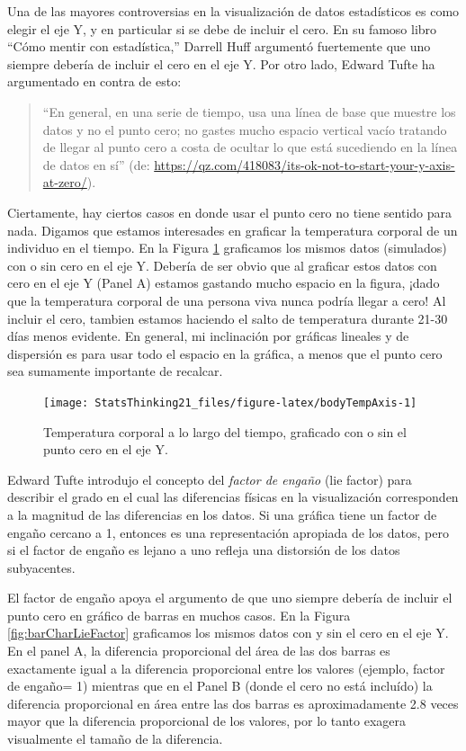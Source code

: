 \documentclass[
  12pt,
]{book}
\theoremstyle{definition}
\theoremstyle{definition}
\theoremstyle{definition}
\theoremstyle{remark}
\begin{document}
Una de las mayores controversias en la visualización de datos estadísticos es como elegir el eje Y, y en particular si se debe de incluir el cero. En su famoso libro ``Cómo mentir con estadística,'' Darrell Huff argumentó fuertemente que uno siempre debería de incluir el cero en el eje Y. Por otro lado, Edward Tufte ha argumentado en contra de esto:

\begin{quote}
``En general, en una serie de tiempo, usa una línea de base que muestre los datos y no el punto cero; no gastes mucho espacio vertical vacío tratando de llegar al punto cero a costa de ocultar lo que está sucediendo en la línea de datos en sí'' (de: \url{https://qz.com/418083/its-ok-not-to-start-your-y-axis-at-zero/}).
\end{quote}

Ciertamente, hay ciertos casos en donde usar el punto cero no tiene sentido para nada. Digamos que estamos interesades en graficar la temperatura corporal de un individuo en el tiempo. En la Figura \ref{fig:bodyTempAxis} graficamos los mismos datos (simulados) con o sin cero en el eje Y. Debería de ser obvio que al graficar estos datos con cero en el eje Y (Panel A) estamos gastando mucho espacio en la figura, ¡dado que la temperatura corporal de una persona viva nunca podría llegar a cero! Al incluir el cero, tambien estamos haciendo el salto de temperatura durante 21-30 días menos evidente. En general, mi inclinación por gráficas lineales y de dispersión es para usar todo el espacio en la gráfica, a menos que el punto cero sea sumamente importante de recalcar.

\begin{figure}
\texttt{[image: StatsThinking21\_files/figure-latex/bodyTempAxis-1]} \caption{Temperatura corporal a lo largo del tiempo, graficado con o sin el punto cero en el eje Y.}\label{fig:bodyTempAxis}
\end{figure}

Edward Tufte introdujo el concepto del \emph{factor de engaño} (lie factor) para describir el grado en el cual las diferencias físicas en la visualización corresponden a la magnitud de las diferencias en los datos. Si una gráfica tiene un factor de engaño cercano a 1, entonces es una representación apropiada de los datos, pero si el factor de engaño es lejano a uno refleja una distorsión de los datos subyacentes.

El factor de engaño apoya el argumento de que uno siempre debería de incluir el punto cero en gráfico de barras en muchos casos. En la Figura \ref{fig:barCharLieFactor} graficamos los mismos datos con y sin el cero en el eje Y. En el panel A, la diferencia proporcional del área de las dos barras es exactamente igual a la diferencia proporcional entre los valores (ejemplo, factor de engaño= 1) mientras que en el Panel B (donde el cero no está incluído) la diferencia proporcional en área entre las dos barras es aproximadamente 2.8 veces mayor que la diferencia proporcional de los valores, por lo tanto exagera visualmente el tamaño de la diferencia.
\end{document}
